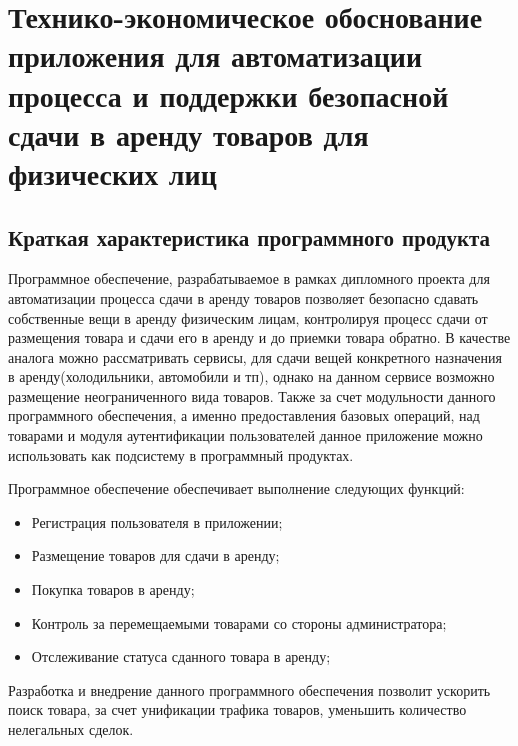 \FPeval{\netProfitExact}{(\profitIncWithOneIndex + \profitIncFullYearWithTwoIndex + \profitIncFullYearWithThreeIndex) / \paybackInYears}



\section{Технико-экономическое обоснование приложения для автоматизации процесса и поддержки безопасной сдачи в аренду товаров для физических лиц}
\label{sec:economics}

\subsection{Краткая характеристика программного продукта}
\label{sub:economics:description}

Программное обеспечение, разрабатываемое в рамках дипломного проекта для автоматизации процесса сдачи в аренду товаров позволяет безопасно сдавать собственные вещи в аренду физическим лицам, контролируя процесс сдачи от размещения товара и сдачи его в аренду и до приемки товара обратно.
В качестве аналога можно рассматривать сервисы, для сдачи вещей конкретного назначения в аренду(холодильники, автомобили и тп), однако на данном сервисе возможно размещение неограниченного вида товаров.
Также за счет модульности данного программного обеспечения, а именно предоставления базовых операций, над товарами и модуля аутентификации пользователей данное приложение можно использовать как подсистему в программный продуктах.

Программное обеспечение обеспечивает выполнение следующих функций:
\begin{itemize}
  \item Регистрация пользователя в приложении;
  \item Размещение товаров для сдачи в аренду;
  \item Покупка товаров в аренду;
  \item Контроль за перемещаемыми товарами со стороны администратора;
  \item Отслеживание статуса сданного товара в аренду;
\end{itemize}

Разработка и внедрение данного программного обеспечения позволит ускорить поиск товара, за счет унификации трафика товаров, уменьшить количество нелегальных сделок.

